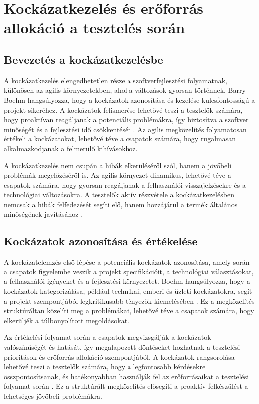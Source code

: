 \section{Kockázatkezelés és erőforrás allokáció a tesztelés során}
\subsection{Bevezetés a kockázatkezelésbe}
A kockázatkezelés elengedhetetlen része a szoftverfejlesztési folyamatnak, különösen az agilis környezetekben, ahol a változások gyorsan történnek. Barry Boehm hangsúlyozza, hogy a kockázatok azonosítása és kezelése kulcsfontosságú a projekt sikeréhez. A kockázatok felismerése lehetővé teszi a tesztelők számára, hogy proaktívan reagáljanak a potenciális problémákra, így biztosítva a szoftver minőségét és a fejlesztési idő csökkentését \cite[23]{boehm1989software}. Az agilis megközelítés folyamatosan értékeli a kockázatokat, lehetővé téve a csapatok számára, hogy rugalmasan alkalmazkodjanak a felmerülő kihívásokhoz.

A kockázatkezelés nem csupán a hibák elkerüléséről szól, hanem a jövőbeli problémák megelőzéséről is. Az agilis környezet dinamikus, lehetővé téve a csapatok számára, hogy gyorsan reagáljanak a felhasználói visszajelzésekre és a technológiai változásokra. A tesztelők aktív részvétele a kockázatkezelésben nemcsak a hibák felfedezését segíti elő, hanem hozzájárul a termék általános minőségének javításához \cite[45]{boehm1989software}.

\subsection{Kockázatok azonosítása és értékelése}
A kockázatelemzés első lépése a potenciális kockázatok azonosítása, amely során a csapatok figyelembe veszik a projekt specifikációit, a technológiai választásokat, a felhasználói igényeket és a fejlesztési környezetet. Boehm hangsúlyozza, hogy a kockázatok kategorizálása, például technikai, emberi és üzleti kockázatokra, segít a projekt szempontjából legkritikusabb tényezők kiemelésében \cite[67]{boehm1989software}. Ez a megközelítés struktúráltan közelíti meg a problémákat, lehetővé téve a csapatok számára, hogy elkerüljék a túlbonyolított megoldásokat.

Az értékelési folyamat során a csapatok megvizsgálják a kockázatok valószínűségét és hatását, így megalapozott döntéseket hozhatnak a tesztelési prioritások és erőforrás-allokáció szempontjából. A kockázatok rangsorolása lehetővé teszi a tesztelők számára, hogy a legfontosabb kérdésekre összpontosítsanak, és hatékonyabban használják fel az erőforrásaikat a tesztelési folyamat során \cite[89]{boehm1989software}. Ez a struktúrált megközelítés elősegíti a proaktív felkészülést a lehetséges jövőbeli problémákra.

